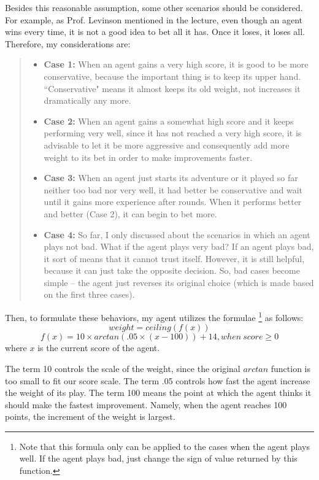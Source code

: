 \documentclass[10pt]{article}
\begin{document}
Besides this reasonable assumption, some other scenarios should be considered. For example, as Prof. Levinson mentioned in the lecture, even though an agent wins every time, it is not a good idea to bet all it has. Once it loses, it loses all. Therefore, my considerations are:
\begin{quote}
\begin{itemize}
\item \textbf{Case 1:} When an agent gains a very high score, it is good to be more conservative, because the important thing is to keep its upper hand. ``Conservative" means it almost keeps its old weight, not increases it dramatically any more.
\item \textbf{Case 2:} When an agent gains a somewhat high score and it keeps performing very well, since it has not reached a very high score, it is advisable to let it be more aggressive and consequently add more weight to its bet in order to make improvements faster.
\item \textbf{Case 3:} When an agent just starts its adventure or it played so far neither too bad nor very well, it had better be conservative and wait until it gains more experience after rounds. When it performs better and better (Case 2), it can begin to bet more.
\item \textbf{Case 4:} So far, I only discussed about the scenarios in which an agent plays not bad. What if the agent plays very bad? If an agent plays bad, it sort of means that it cannot trust itself. However, it is still helpful, because it can just take the opposite decision. So, bad cases become simple -- the agent just reverses its original choice (which is made based on the first three cases).
\end{itemize}
\end{quote}

Then, to formulate these behaviors, my agent utilizes the formulae \footnote{Note that this formula only can be applied to the cases when the agent plays well. If the agent plays bad, just change the sign of value returned by this function.} as follows:
$$
weight=ceiling(f(x))
$$
$$
f(x)=10\times arctan(.05\times (x - 100)) + 14, when\ score\geq 0
$$
where $x$ is the current score of the agent.

The term 10 controls the scale of the weight, since the original $arctan$ function is too small to fit our score scale. The term .05 controls how fast the agent increase the weight of its play. The term 100 means the point at which the agent thinks it should make the fastest improvement. Namely, when the agent reaches 100 points, the increment of the weight is largest.
\end{document}
